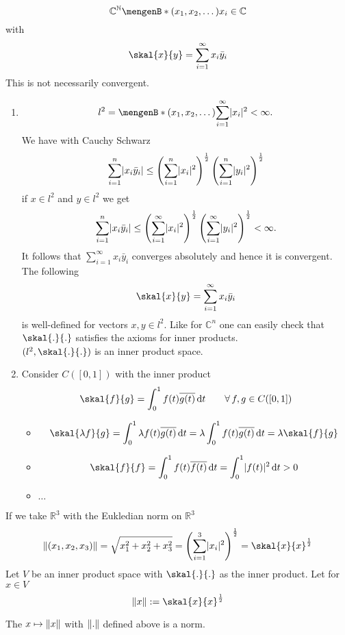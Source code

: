 \[
	\mathbb{C}^{\mathbb{N}} \set[(x_1,x_2, \dots)]{x_i \in \mathbb{C}}
\]
with
\[
	\skal{x}{y} = \sum^{\infty}_{i=1} x_i \bar{y}_i 
\]
This is not necessarily convergent.
\begin{beispiele}
	\begin{enumerate}[(1)]
		\item 	\[
		l^2 = \set[(x_1,x_2, \dots)]{ \sum^{\infty}_{i=1} \abs{x_i}^2 < \infty}.
	\]
	We have with Cauchy Schwarz
	\[
		\sum^{n}_{i=1} \lvert x_i \bar{y}_i\rvert \leq \left( \sum^{n}_{i=1} \lvert x_i\rvert^2 \right)^{\frac{1}{2}} \left( \sum^{n}_{i=1} \lvert y_i\rvert^2 \right)^{\frac{1}{2}}
	\]
	if $x \in l^2$ and $y \in l^2$ we get
	\begin{align*}
		\sum^{n}_{i=1}\lvert x_i \bar{y}_i\rvert \leq \left( \sum^{\infty}_{i=1} \lvert x_i\rvert^2 \right)^{\frac{1}{2}} \left( \sum_{i=1}^{\infty} \lvert y_i\rvert^2 \right)^{\frac{1}{2}} < \infty.
	\end{align*}
	It follows that $\sum_{i=1}^{\infty} x_i \bar{y}_i$ converges absolutely and hence it is convergent. The following 
	\[
		\skal{x}{y} = \sum^{\infty}_{i=1} x_i \bar{y}_i
	\]
	is well-defined for vectors $x,y \in l^2$. Like for $\mathbb{C}^n$ one can easily check that $\skal{.}{.}$ satisfies the axioms for inner products. \\
	$(l^2, \skal{.}{.})$ is an inner product space.
	\item Consider $C([0,1])$ with the inner product
	\[
		\skal{f}{g} = \int_{0}^{1}f(t) \overline{g(t)} \,\mathrm{d}t \qquad \forall\, f,g \in C([0,1])
	\]
	\begin{itemize}
		\item 	\[
			\skal{\lambda f}{g} = \int_{0}^{1}\lambda f(t) \overline{g(t)} \,\mathrm{d}t = \lambda \int_{0}^{1}f(t) \overline{g(t)} \,\mathrm{d}t = \lambda \skal{f}{g}
		\]
		\item \[
			\skal{f}{f} = \int_{0}^{1}f(t) \overline{f(t)} \,\mathrm{d}t = \int_{0}^{1} \abs{f(t)}^2 \,\mathrm{d}t >0
		\]	
		\item $\dots$
	\end{itemize}
	\end{enumerate}
\end{beispiele}
If we take $\mathbb{R}^3$ with the Eukledian norm on $\mathbb{R}^3$
\[
	\norm{(x_1,x_2,x_3)} = \sqrt{x_1^2 + x_2^2 + x_3^2} = \left( \sum_{i=1}^{3} \abs{x_i}^2 \right)^{\frac{1}{2}} = \skal{x}{x}^{\frac{1}{2}}
\]
Let $V$ be an inner product space with $\skal{.}{.}$ as the inner product. Let for $x \in V$
\[
	\norm{x} := \skal{x}{x}^{\frac{1}{2}}
\]
\begin{satz}
	The $x \mapsto  \norm{x}$ with $\norm{.}$ defined above is a norm.
\end{satz}
